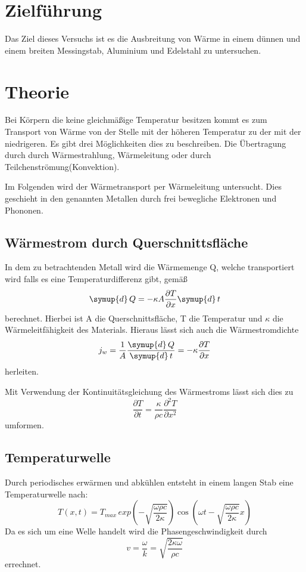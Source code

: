 \section{Zielführung}
\label{sec:Zielführung}
Das Ziel dieses Versuchs ist es die Ausbreitung von Wärme in einem dünnen
und einem breiten Messingstab, Aluminium und Edelstahl zu untersuchen.




\section{Theorie}
\label{sec:Theorie}
Bei Körpern die keine gleichmäßige Temperatur besitzen kommt es zum Transport
von Wärme von der Stelle mit der höheren Temperatur zu der mit der niedrigeren.
Es gibt drei Möglichkeiten dies zu beschreiben. Die Übertragung durch
durch Wärmestrahlung, Wärmeleitung oder durch Teilchenströmung(Konvektion).

Im Folgenden wird der Wärmetransport per Wärmeleitung untersucht. Dies geschieht
in den genannten Metallen durch frei bewegliche Elektronen und Phononen.

\subsection{Wärmestrom durch Querschnittsfläche}
In dem zu betrachtenden Metall wird die Wärmemenge Q, welche transportiert
wird falls es eine Temperaturdifferenz gibt, gemäß
\begin{equation}
 \symup{d}\,Q = -\kappa A\frac{\partial T}{\partial x}\symup{d}\,t
 \label{eqn:dQ}
\end{equation}
berechnet.
Hierbei ist A die Querschnittsfläche, T die Temperatur und $\kappa$ die
Wärmeleitfähigkeit des Materials. Hieraus lässt sich auch die Wärmestromdichte
\begin{equation}
  j_w = \frac{1}{A}\frac{\symup{d}\,Q}{\symup{d}\,t} = - \kappa
  \frac{\partial T}{\partial x}
  \label{eqn:jw}
\end{equation}
herleiten.

Mit Verwendung der Kontinuitätsgleichung des Wärmestroms lässt sich
dies zu
\begin{equation}
  \frac{\partial T}{\partial t} = \frac{\kappa}{\rho c}\frac{{\partial}^{2} T}
  {\partial {x}^{2}}
  \label{eqn:delT/delt}
\end{equation}
umformen.

\subsection{Temperaturwelle}
Durch periodisches erwärmen und abkühlen entsteht in einem langen Stab
eine Temperaturwelle nach:
\begin{equation}
  T(x,t)= T_{max}\,exp\left(-\sqrt{\frac{\omega\rho c}{2\kappa}}\right)
  \cos\left(\omega t - \sqrt{\frac{\omega\rho c}{2\kappa}}x\right)
  \label{eqn:T(x,t)}
\end{equation}
Da es sich um eine Welle handelt wird die Phasengeschwindigkeit durch
\begin{equation}
  v= \frac{\omega}{k} = \sqrt{\frac{2\kappa\omega}{\rho c}}
  \label{eqn:vpha}
\end{equation}
errechnet.

